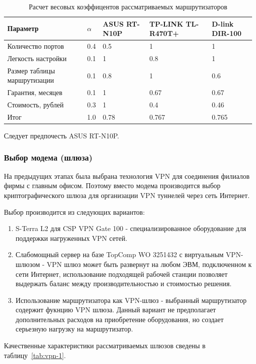 \documentclass[russian,utf8,emptystyle]{eskdtext}
\begin{document}
\begin{longtable}{p{7cm}|p{1cm}|p{2cm}|p{2cm}|p{2cm}}
\caption{Расчет весовых коэффицентов рассматриваемых маршрутизаторов}
\label{tab:routers-2} \\
Параметр                     & $\alpha$ & ASUS RT-N10P & TP-LINK TL-R470T+ & D-link DIR-100 \\ 
\hline 
Количество портов            & 0.4      & 0.5       & 1      & 1  \\ 
Легкость настройки           & 0.1      & 1         & 0.8    & 1  \\ 
Размер таблицы маршрутизации & 0.1      & 0.8       & 1      & 0.6  \\ 
Гарантия, месяцев            & 0.1      & 1         & 0.67   & 0.67  \\ 
Стоимость, рублей            & 0.3      & 1         & 0.4    & 0.46 \\
\hline
Итог                         & 1.0      & 0.78      & 0.767  & 0.765    
\end{longtable}

Следует предпочесть ASUS RT-N10P.

\clearpage
\subsubsection{Выбор модема (шлюза)}
На предыдущих этапах была выбрана технология VPN для соединения филиалов фирмы с главным офисом. Поэтому вместо модема производится выбор криптографического шлюза для организации VPN туннелей через сеть Интернет.

Выбор производится из следующих вариантов:
\begin{enumerate}[label=\arabic*.]
\item S-Terra L2 для CSP VPN Gate 100 - специализированное оборудование для поддержки нагруженных VPN сетей.
\item Слабомощный сервер на базе TopComp WO 3251432 с виртуальным VPN-шлюзом - VPN шлюз может быть развернут на любом ЭВМ, подключенном к сети Интернет, использование подходящей рабочей станции позволяет выдержать баланс между производительностью и стоимостью решения.
\item Использование маршрутизатора как VPN-шлюз - выбранный маршрутизатор содержит фукнцию VPN шлюза. Данный вариант не предполагает дополнительных расходов на приобретение оборудования, но создает серьезную нагрузку на маршрутизатор.
\end{enumerate}

Качественные характеристики рассматриваемых шлюзов сведены в таблицу~\ref{tab:vpn-1}.
\end{document}
